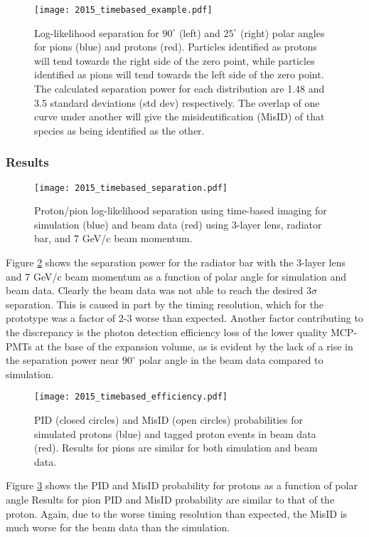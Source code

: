 \begin{figure}[!htb]
	\centering
	\texttt{[image: 2015\_timebased\_example.pdf]}
	\caption[Log-likelihood separation for $90^\circ$ (left) and $25^\circ$ (right) polar angles for pions (blue) and protons (red).]{Log-likelihood separation for $90^\circ$ (left) and $25^\circ$ (right) polar angles for pions (blue) and protons (red). Particles identified as protons will tend towards the right side of the zero point, while particles identified as pions will tend towards the left side of the zero point. The calculated separation power for each distribution are 1.48 and 3.5 standard deviations (std dev) respectively.  The overlap of one curve under another will give the misidentification (MisID) of that species as being identified as the other.}
	\label{fig:2015_timebased_example}
\end{figure}

\subsubsection{Results}
\begin{figure}[!htb]
	\centering
	\texttt{[image: 2015\_timebased\_separation.pdf]}
	\caption{Proton/pion log-likelihood separation using time-based imaging for simulation (blue) and beam data (red) using 3-layer lens, radiator bar, and 7 GeV/c beam momentum.}
	\label{fig:2015_timebased_separation}
\end{figure}

Figure \ref{fig:2015_timebased_separation} shows the separation power for the radiator bar with the 3-layer lens and 7 GeV/c beam momentum as a function of polar angle for simulation and beam data. Clearly the beam data was not able to reach the desired $3\sigma$ separation. This is caused in part by the timing resolution, which for the prototype was a factor of 2-3 worse than expected. Another factor contributing to the discrepancy is the photon detection efficiency loss of the lower quality MCP-PMTs at the base of the expansion volume, as is evident by the lack of a rise in the separation power near $90^\circ$ polar angle in the beam data compared to simulation.

\begin{figure}[!htb]
	\centering
	\texttt{[image: 2015\_timebased\_efficiency.pdf]}
	\caption[PID (closed circles) and MisID (open circles) probabilities for simulated protons (blue) and tagged proton events in beam data (red).]{PID (closed circles) and MisID (open circles) probabilities for simulated protons (blue) and tagged proton events in beam data (red). Results for pions are similar for both simulation and beam data.}
	\label{fig:2015_timebased_efficiency}
\end{figure}
Figure \ref{fig:2015_timebased_efficiency} shows the PID and MisID probability for protons as a function of polar angle Results for pion PID and MisID probability are similar to that of the proton. Again, due to the worse timing resolution than expected, the MisID is much worse for the beam data than the simulation.
